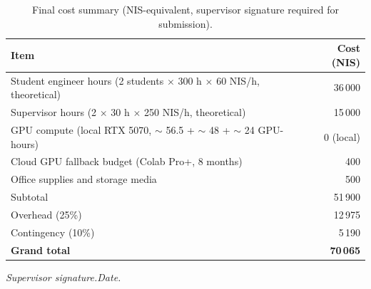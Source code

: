 \begin{table}[htbp]
\centering
\caption{Final cost summary (NIS-equivalent, supervisor signature required for submission).}
\label{tab:cost}
\setlength{\tabcolsep}{4pt}
\renewcommand{\arraystretch}{1.1}
\begin{tabular}{lr}
\toprule
Item & Cost (NIS) \\
\midrule
Student engineer hours (2 students $\times$ 300 h $\times$ 60 NIS/h, theoretical) & 36\,000 \\
Supervisor hours (2 $\times$ 30 h $\times$ 250 NIS/h, theoretical) & 15\,000 \\
GPU compute (local RTX 5070, $\sim$ 56.5 + $\sim$ 48 + $\sim$ 24 GPU-hours)        & 0 (local) \\
Cloud GPU fallback budget (Colab Pro+, 8 months) & 400 \\
Office supplies and storage media & 500 \\
Subtotal & 51\,900 \\
Overhead (25\%) & 12\,975 \\
Contingency (10\%) & 5\,190 \\
\midrule
\textbf{Grand total} & \textbf{70\,065} \\
\bottomrule
\end{tabular}
\end{table}

\vspace{1em}
\noindent
\textit{Supervisor signature.\quad\dotfill\quad Date.\quad\dotfill}

